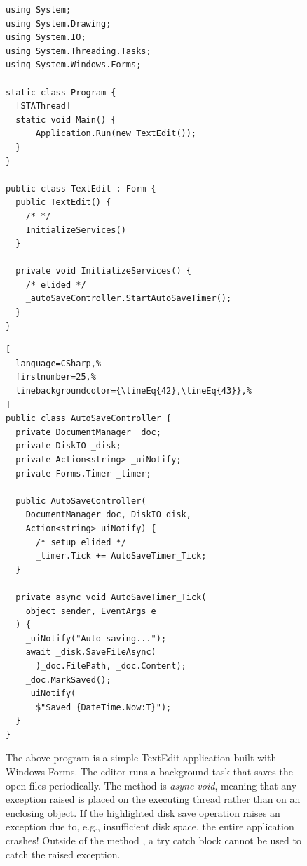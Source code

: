 \begin{figure}
  \begin{minipage}[t]{0.49\textwidth}
\begin{lstlisting}[language=CSharp]
using System;
using System.Drawing;
using System.IO;
using System.Threading.Tasks;
using System.Windows.Forms;

static class Program {
  [STAThread]
  static void Main() {
      Application.Run(new TextEdit());
  }
}

public class TextEdit : Form {
  public TextEdit() { 
    /* */ 
    InitializeServices()
  }

  private void InitializeServices() {
    /* elided */
    _autoSaveController.StartAutoSaveTimer();
  }
}
\end{lstlisting}
  \end{minipage}\hfill%
  \begin{minipage}[t]{0.49\textwidth}
\begin{lstlisting}[
  language=CSharp,%
  firstnumber=25,%
  linebackgroundcolor={\lineEq{42},\lineEq{43}},%
]
public class AutoSaveController {
  private DocumentManager _doc;
  private DiskIO _disk;
  private Action<string> _uiNotify;
  private Forms.Timer _timer;

  public AutoSaveController(
    DocumentManager doc, DiskIO disk,
    Action<string> uiNotify) {
      /* setup elided */
      _timer.Tick += AutoSaveTimer_Tick;
  }

  private async void AutoSaveTimer_Tick(
    object sender, EventArgs e
  ) {
    _uiNotify("Auto-saving...");
    await _disk.SaveFileAsync(
      )_doc.FilePath, _doc.Content);
    _doc.MarkSaved();
    _uiNotify(
      $"Saved {DateTime.Now:T}");
  }
}
\end{lstlisting}
  \end{minipage}
  \cprotect\caption{The above \CSharp{} program is a simple TextEdit application built with Windows Forms. The editor runs a background task that saves the open files periodically. The method  is \textit{async void}, meaning that any exception raised is placed on the executing thread rather than on an enclosing  object. If the highlighted disk save operation raises an exception due to, e.g., insufficient disk space, the entire application crashes! Outside of the method , a try catch block cannot be used to catch the raised exception.}
  \label{fig:wat:csharp-exn}
\end{figure}

